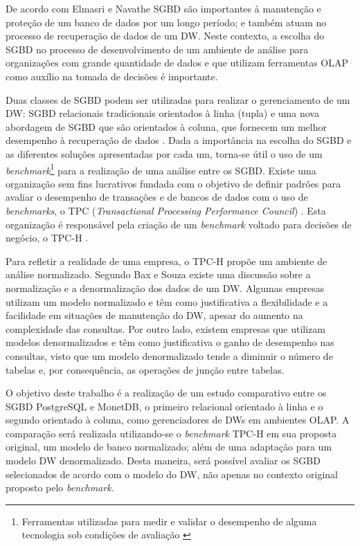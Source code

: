 De acordo com Elmasri e Navathe \cite{navathe2011banco} SGBD são importantes à manutenção 
e proteção de um banco de dados por um longo período; e também atuam no processo de recuperação de dados de um DW. Neste contexto, 
a escolha do SGBD no processo de desenvolvimento de um ambiente de análise para organizações com grande quantidade de dados e que utilizam ferramentas OLAP 
como auxílio na tomada de decisões é importante. 

Duas classes de SGBD podem ser utilizadas para realizar o gerenciamento de um DW: SGBD relacionais tradicionais orientados à linha (tupla) e uma nova abordagem de SGBD que são orientados à coluna, que fornecem um melhor desempenho à recuperação de dados \cite{good2017column}. 
Dada a importância na escolha do SGBD e as diferentes soluções apresentadas por cada um, torna-se útil o uso de um 
\textit{benchmark}\footnote{Ferramentas utilizadas para medir e validar o desempenho de alguma tecnologia sob condições de avaliação \cite{bouckaert2010benchmarking}} 
para a realização de uma análise entre os SGBD. Existe uma organização sem fins lucrativos fundada com o objetivo de definir padrões para avaliar o 
desempenho de transações e de bancos de dados com o uso de \textit{benchmarks}, o TPC (\textit{Transactional Processing Performance Council}) \cite{tpc2017page}. 
Esta organização é responsável pela criação de um \textit{benchmark} voltado para decisões de negócio, o TPC-H \cite{tpch2017page}.

Para refletir a realidade de uma empresa, o TPC-H propõe um ambiente de análise normalizado. Segundo Bax e Souza \cite{bax2003modelagem} 
existe uma discussão sobre a normalização e a denormalização dos dados de um DW. Algumas empresas utilizam um modelo normalizado e têm como 
justificativa a flexibilidade e a facilidade em situações de manutenção do DW, apesar do aumento na complexidade das consultas. Por outro lado, existem empresas que utilizam modelos denormalizados e têm como justificativa o ganho de desempenho nas consultas, visto que um modelo denormalizado tende a diminuir o número de tabelas e, por consequência, as operações de junção entre tabelas. 

O objetivo deste trabalho é a realização de um estudo comparativo entre os SGBD PostgreSQL e MonetDB, o primeiro relacional orientado à linha e o segundo orientado à coluna, 
como gerenciadores de DWs em ambientes OLAP. A comparação será realizada utilizando-se o \textit{benchmark} TPC-H em sua proposta original, um modelo de banco normalizado; 
além de uma adaptação para um modelo DW denormalizado. Desta maneira, será possível avaliar os SGBD selecionados de acordo com o modelo do DW, não apenas no 
contexto original proposto pelo \textit{benchmark}. 

